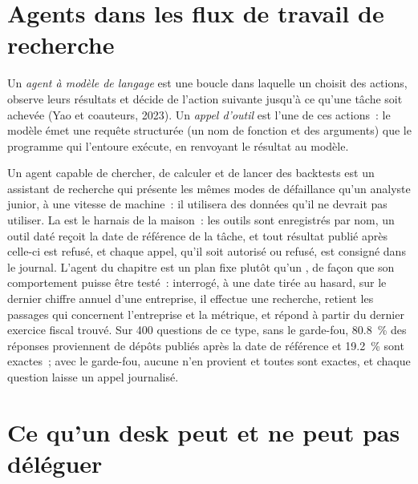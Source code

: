 \section{Agents dans les flux de travail de recherche}

\begin{definition}\label{def:ml:large-language-models-in-finance:agent}
Un \emph{agent à modèle de langage} est une boucle dans laquelle un  choisit des actions, observe leurs
résultats et décide de l'action suivante jusqu'à ce qu'une tâche soit achevée (Yao et coauteurs, 2023). Un \emph{appel d'outil} est
l'une de ces actions~: le modèle émet une requête structurée (un nom de fonction et des arguments) que le programme qui l'entoure exécute,
en renvoyant le résultat au modèle.
\end{definition}

Un agent capable de chercher, de calculer et de lancer des backtests est un assistant de recherche qui présente les mêmes modes de défaillance qu'un analyste junior,
à une vitesse de machine~: il utilisera des données qu'il ne devrait pas utiliser. La  est le harnais de la maison~: les outils sont enregistrés par
nom, un outil daté reçoit la date de référence de la tâche, et tout résultat publié après celle-ci est refusé, et chaque appel,
qu'il soit autorisé ou refusé, est consigné dans le journal. L'agent du chapitre est un plan fixe plutôt qu'un , de façon que son comportement
puisse être testé~: interrogé, à une date tirée au hasard, sur le dernier chiffre annuel d'une entreprise, il effectue une recherche, retient les passages qui concernent
l'entreprise et la métrique, et répond à partir du dernier exercice fiscal trouvé. Sur 400 questions de ce type, sans le garde-fou, 80.8~\%
des réponses proviennent de dépôts publiés après la date de référence et 19.2~\% sont exactes~; avec le garde-fou, aucune n'en provient et toutes sont exactes, et
chaque question laisse un appel journalisé.

\section{Ce qu'un desk peut et ne peut pas déléguer}

